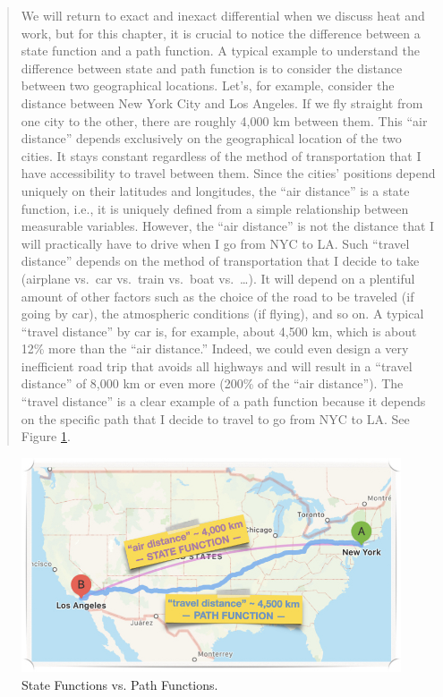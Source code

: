 \documentclass[
  9pt,
]{extbook}
\theoremstyle{definition}
\theoremstyle{definition}
\theoremstyle{definition}
\theoremstyle{remark}
\begin{document}
\begin{quote}
We will return to exact and inexact differential when we discuss heat and work, but for this chapter, it is crucial to notice the difference between a state function and a path function. A typical example to understand the difference between state and path function is to consider the distance between two geographical locations. Let's, for example, consider the distance between New York City and Los Angeles. If we fly straight from one city to the other, there are roughly 4,000 km between them. This ``air distance'' depends exclusively on the geographical location of the two cities. It stays constant regardless of the method of transportation that I have accessibility to travel between them. Since the cities' positions depend uniquely on their latitudes and longitudes, the ``air distance'' is a state function, i.e., it is uniquely defined from a simple relationship between measurable variables. However, the ``air distance'' is not the distance that I will practically have to drive when I go from NYC to LA. Such ``travel distance'' depends on the method of transportation that I decide to take (airplane vs.~car vs.~train vs.~boat vs.~\ldots). It will depend on a plentiful amount of other factors such as the choice of the road to be traveled (if going by car), the atmospheric conditions (if flying), and so on. A typical ``travel distance'' by car is, for example, about 4,500 km, which is about 12\% more than the ``air distance.'' Indeed, we could even design a very inefficient road trip that avoids all highways and will result in a ``travel distance'' of 8,000 km or even more (200\% of the ``air distance''). The ``travel distance'' is a clear example of a path function because it depends on the specific path that I decide to travel to go from NYC to LA. See Figure \ref{fig:Fig2c1}.
\end{quote}

\begin{figure}

{\centering \includegraphics[width=0.6\linewidth]{./img/OEP_Figures.002} 

}

\caption{State Functions vs. Path Functions.}\label{fig:Fig2c1}
\end{figure}
\end{document}
